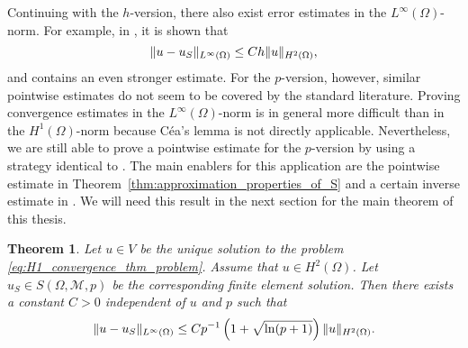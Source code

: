 \documentclass[english, 12pt, a4paper, sci, utf8, a-2b, online]{aaltothesis}
\theoremstyle{definition}
\theoremstyle{plain}
\newtheorem{theorem}{Theorem}[section]
\DeclarePairedDelimiter\norm{\lVert}{\rVert}
\numberwithin{equation}{section}
\begin{document}
Continuing with the $h$-version, there also exist error estimates
in the $L^{\infty}(\Omega)$-norm.
For example, in \cite{braess2007}, it is shown that
\begin{equation*}
    \norm{u - u_S}_{L^{\infty}(\Omega)} \leq C h \norm{u}_{H^2(\Omega)},
\end{equation*}
and \cite{ciarlet2002} contains an even stronger estimate.
For the $p$-version, however, similar pointwise estimates do not seem to be
covered by the standard literature. Proving convergence estimates in the $L^{\infty}(\Omega)$-norm
is in general more difficult than in the $H^1(\Omega)$-norm
because Céa's lemma is not directly applicable.
Nevertheless, we are still able to prove a pointwise estimate for the $p$-version by
using a strategy identical to \cite[p.\ 93]{braess2007}.
The main enablers for this application are the pointwise estimate in
Theorem~\ref{thm:approximation_properties_of_S} and a certain inverse estimate
in \cite{schwab1998}. We will need this result in the next section for the
main theorem of this thesis.
\begin{theorem}
    \label{thm:pointwise_convergence_of_p_version}
    Let $u \in V$ be the unique solution to the problem \eqref{eq:H1_convergence_thm_problem}.
    Assume that $u \in H^2(\Omega)$.
    Let $u_S \in S(\Omega, \mathcal{M}, p)$ be the corresponding
    finite element solution. Then there exists a constant $C > 0$
    independent of $u$ and $p$ such that
    \begin{equation*}
        \norm{u-u_S}_{L^{\infty}(\Omega)}
        \leq C p^{-1} \left( 1 + \sqrt{\ln(p+1)} \right) \norm{u}_{H^2(\Omega)}.
    \end{equation*}
\end{theorem}
\end{document}
